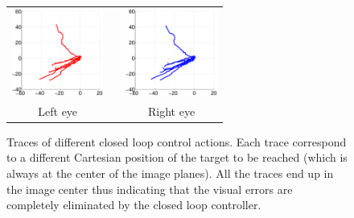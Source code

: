 \begin{figure}
  \begin{center}
	\begin{tabular}{ccc}
	  \parbox{30mm}{\includegraphics[width=30mm]{Figure/LeftEyeClosedLoop.eps}}  & \hspace{.1cm} &
	  \parbox{30mm}{\includegraphics[width=30mm]{Figure/RightEyeClosedLoop.eps}}
	  \\
	  \parbox{30mm}{\centering Left eye } & \hspace{0.1cm} & \parbox{30mm}{\centering Right eye }
  \end{tabular}
\end{center}
\caption{Traces of different closed loop control actions. Each trace correspond to a different Cartesian position of the target to be reached (which 
is always at the center of the image planes). All the traces end up in the image center thus indicating that the visual errors are completely eliminated by the closed loop controller.}\label{Fig:ImagePlaneClosedLoopErrors}
  \end{figure}

